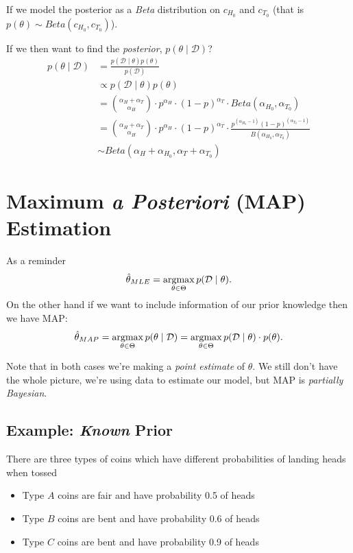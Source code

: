 If we model the posterior as a \emph{Beta} distribution on $c_{H_0}$ and $c_{T_0}$
(that is $p(\theta)\sim Beta(c_{H_0},c_{T_0})$).

If we then want to find the \textit{posterior}, $p(\theta\mid\mathcal{D})$? 
\begin{align*}
p(\theta\mid\mathcal{D}) & = \frac{p(\mathcal{D}\mid\theta)p(\theta)}{p(\mathcal{D})}\\
				& \propto p(\mathcal{D}\mid\theta)p(\theta)\\
				& = {{\alpha_H + \alpha_T} \choose \alpha_H} \cdot p^{\alpha_H} \cdot (1-p)^{\alpha_T} \cdot Beta(\alpha_{H_0},\alpha_{T_0})\\
				& = {{\alpha_H + \alpha_T} \choose \alpha_H} \cdot p^{\alpha_H} \cdot (1-p)^{\alpha_T} \cdot \frac{p^{(\alpha_{H_0}-1)}(1-p)^{(\alpha_{T_0}-1)}}{B(\alpha_{H_0},\alpha_{T_0})}\\
				& \sim Beta(\alpha_{H}+\alpha_{H_0},\alpha_{T}+\alpha_{T_0})
\end{align*}

\section{Maximum \textit{a Posteriori} (MAP) Estimation}

As a reminder 
\[\hat\theta_{MLE} = \operatorname*{argmax}_{\theta\in\Theta} p(\mathcal{D}\mid \theta).\]
On the other hand if we want to include information of our prior knowledge 
then we have MAP:
\[\hat\theta_{MAP} = \operatorname*{argmax}_{\theta\in\Theta} p(\theta\mid\mathcal{D}) =  \operatorname*{argmax}_{\theta\in\Theta} p(\mathcal{D}\mid \theta)\cdot p(\theta).\]

Note that in both cases we're making a \emph{point estimate} of $\theta$. 
We still don't have the whole picture, we're using data to estimate our model, 
but MAP is \emph{partially Bayesian}. 


\subsection{Example: \textit{Known} Prior}
There are three types of coins which have different probabilities of landing heads when tossed
\begin{itemize}
\item[] Type $A$ coins are fair and have probability 0.5 of heads
\item[] Type $B$ coins are bent and have probability 0.6 of heads
\item[] Type $C$ coins are bent and have probability 0.9 of heads
\end{itemize}

